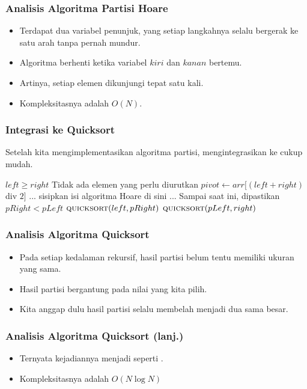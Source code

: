 \begin{frame}
\frametitle{Analisis Algoritma Partisi Hoare}
\begin{itemize}
  \item Terdapat dua variabel penunjuk, yang setiap langkahnya selalu bergerak ke satu arah tanpa pernah mundur.
  \item Algoritma berhenti ketika variabel $kiri$ dan $kanan$ bertemu.
  \item Artinya, setiap elemen \farray dikunjungi tepat satu kali.
  \item Kompleksitasnya adalah $O(N)$.
\end{itemize}
\end{frame}

\begin{frame}
\frametitle{Integrasi ke Quicksort}
Setelah kita mengimplementasikan algoritma partisi, mengintegrasikan ke \fQuickSort cukup mudah.
\begin{codebox}
\li \If $left \geq right$ \Then 
\li   \Comment Tidak ada elemen yang perlu diurutkan
\li \Else
\li    $pivot \gets arr[(left + right)$ div $2]$
\zi
\li    \Comment ... sisipkan isi algoritma Hoare di sini ...
\li    \Comment Sampai saat ini, dipastikan $pRight < pLeft$
\zi
\li    $\textnormal{\scshape quicksort}(left, pRight)$
\li    $\textnormal{\scshape quicksort}(pLeft, right)$
    \End
\end{codebox}
\end{frame}

\begin{frame}
\frametitle{Analisis Algoritma Quicksort}
\begin{itemize}
  \item Pada setiap kedalaman rekursif, \farray hasil partisi belum tentu memiliki ukuran yang sama.
  \item Hasil partisi bergantung pada nilai  yang kita pilih.
  \item Kita anggap dulu hasil partisi selalu membelah \farray menjadi dua \fsubarray sama besar.
\end{itemize}
\end{frame}

\begin{frame}
\frametitle{Analisis Algoritma Quicksort (lanj.)}
\begin{itemize}
  \item Ternyata kejadiannya menjadi seperti \fMergeSort.
  \item Kompleksitasnya adalah $O(N \log{N})$
\end{itemize}

\end{frame}

